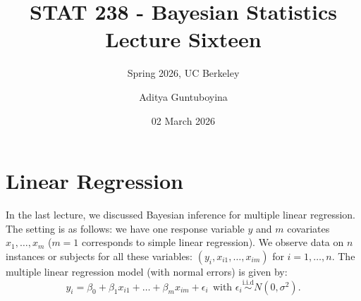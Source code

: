 \documentclass{scrartcl}
\begin{document}
\title{STAT 238 - Bayesian Statistics  \\
  Lecture Sixteen} 
\subtitle{Spring 2026, UC Berkeley}

\author{Aditya Guntuboyina}


\date{02 March 2026}

\maketitle

\section{Linear Regression}

In the last lecture, we discussed Bayesian inference for multiple
linear regression. The setting is as follows: we have one
response variable $y$ and 
$m$ covariates $x_1, \dots, x_m$  ($m = 1$ corresponds to simple linear
regression). We observe data on $n$ instances or subjects for all
these variables: $(y_i, x_{i1}, \dots, x_{im})$ for $i = 1, \dots,
n$. The multiple linear regression model (with normal errors) is given
by: 
\begin{equation}\label{lm}
  y_i = \beta_0 + \beta_1 x_{i1} + \dots + \beta_m x_{im} + \epsilon_i
~~  \text{with $\epsilon_i \overset{\text{i.i.d}}{\sim} N(0, \sigma^2)$}. 
\end{equation}
\end{document}
